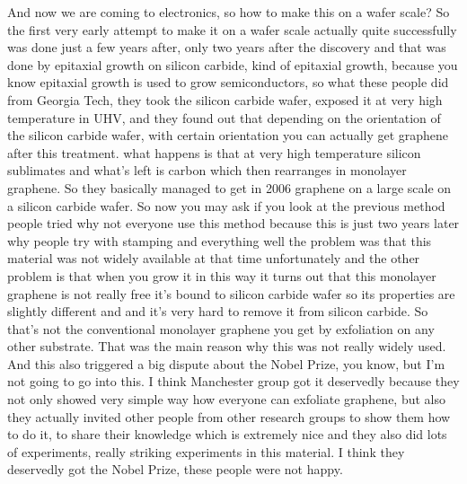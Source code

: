 And now we are coming to electronics, so how to make this on a wafer scale? So the first very early attempt to make it on a wafer scale actually quite successfully was done just a few years after, only two years after the discovery and that was done by epitaxial growth on silicon carbide, kind of epitaxial growth, because you know epitaxial growth is used to grow semiconductors, so what these people did from Georgia Tech, they took the silicon carbide wafer, exposed it at very high temperature in UHV, and they found out that depending on the orientation of the silicon carbide wafer, with certain orientation you can actually get graphene after this treatment. what happens is that at very high temperature silicon sublimates and what's left is carbon which then rearranges in monolayer graphene. So they basically managed to get in 2006 graphene on a large scale on a silicon carbide wafer. So now you may ask if you look at the previous method people tried why not everyone use this method because this is just two years later why people try with stamping and everything well the problem was that this material was not widely available at that time unfortunately and the other problem is that when you grow it in this way it turns out that this monolayer graphene is not really free it's bound to silicon carbide wafer so its properties are slightly different and and it's very hard to remove it from silicon carbide. So that's not the conventional monolayer graphene you get by exfoliation on any other substrate. That was the main reason why this was not really widely used. And this also triggered a big dispute about the Nobel Prize, you know, but I'm not going to go into this. I think Manchester group got it deservedly because they not only showed very simple way how everyone can exfoliate graphene, but also they actually invited other people from other research groups to show them how to do it, to share their knowledge which is extremely nice and they also did lots of experiments, really striking experiments in this material. I think they deservedly got the Nobel Prize, these people were not happy.
